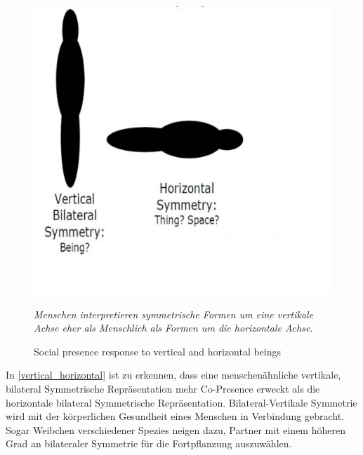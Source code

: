 \documentclass[a4paper,11pt]{article}%
\renewcommand{\\}{\vspace*{0.5\baselineskip} \newline}
\begin{document}
	\begin{figure}[H]
		\begin{footnotesize}
		\centering
			\includegraphics[scale= 0.3]{Abbildungen/Symmetry.JPG}
			\caption[Abbildung 1]{Social presence response to vertical and
horizontal beings}
			\textit{Menschen interpretieren symmetrische Formen um eine vertikale Achse eher als \dq{}Menschlich\dq{} als Formen um die horizontale Achse. \citep{biocca2002defining} }
			\label{vertical_horizontal}
		\end{footnotesize}
	\end{figure}

In \autoref{vertical_horizontal} ist zu erkennen, dass eine menschenähnliche vertikale, bilateral Symmetrische Repräsentation mehr \dq{}Co-Presence\dq{} erweckt als die horizontale bilateral Symmetrische Repräsentation. \citep[p.546-551]{thornhill1998relative}
Bilateral-Vertikale Symmetrie wird mit der körperlichen Gesundheit eines Menschen in Verbindung gebracht. Sogar Weibchen verschiedener Spezies neigen dazu, Partner mit einem höheren Grad an bilateraler Symmetrie für die Fortpflanzung auszuwählen. \citep[p. 659–669]{rhodes1998facial} \citep{biocca2002defining} \citep[p.233–242]{grammer1994human} \ \\
\end{document}
